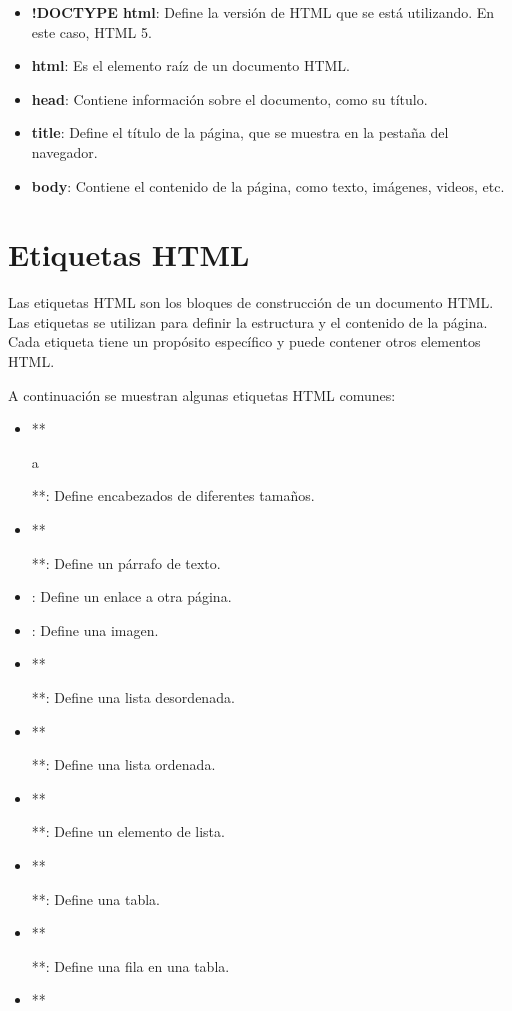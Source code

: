 \documentclass[
  a4paper,
  DIV=11,
  numbers=noendperiod,
  onepage,
  openany]{scrreprt}
\providecommand{\tightlist}{%
  \setlength{\itemsep}{0pt}\setlength{\parskip}{0pt}}\usepackage{longtable,booktabs,array}
\begin{document}
\begin{tcolorbox}
\begin{itemize}
\tightlist
\item
  \textbf{!DOCTYPE html}: Define la versión de HTML que se está
  utilizando. En este caso, HTML 5.
\item
  \textbf{html}: Es el elemento raíz de un documento HTML.
\item
  \textbf{head}: Contiene información sobre el documento, como su
  título.
\item
  \textbf{title}: Define el título de la página, que se muestra en la
  pestaña del navegador.
\item
  \textbf{body}: Contiene el contenido de la página, como texto,
  imágenes, videos, etc.
\end{itemize}

\section{Etiquetas HTML}\label{etiquetas-html}

Las etiquetas HTML son los bloques de construcción de un documento HTML.
Las etiquetas se utilizan para definir la estructura y el contenido de
la página. Cada etiqueta tiene un propósito específico y puede contener
otros elementos HTML.

A continuación se muestran algunas etiquetas HTML comunes:

\begin{itemize}
\tightlist
\item
  **

  a

  **: Define encabezados de diferentes tamaños.
\item
  **

  **: Define un párrafo de texto.
\item
  \textbf{}: Define un enlace a otra página.
\item
  \textbf{}: Define una imagen.
\item
  **

  **: Define una lista desordenada.
\item
  **

  **: Define una lista ordenada.
\item
  **

  **: Define un elemento de lista.
\item
  **

  **: Define una tabla.
\item
  **

  **: Define una fila en una tabla.
\item
  **


\end{itemize}
\end{tcolorbox}
\end{document}
